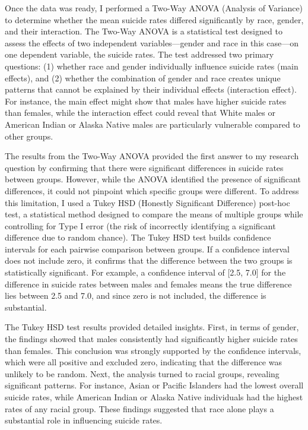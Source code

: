 \documentclass[
  letterpaper,
  DIV=11,
  numbers=noendperiod]{scrartcl}
\begin{document}
Once the data was ready, I performed a Two-Way ANOVA (Analysis of
Variance) to determine whether the mean suicide rates differed
significantly by race, gender, and their interaction. The Two-Way ANOVA
is a statistical test designed to assess the effects of two independent
variables---gender and race in this case---on one dependent variable,
the suicide rates. The test addressed two primary questions: (1) whether
race and gender individually influence suicide rates (main effects), and
(2) whether the combination of gender and race creates unique patterns
that cannot be explained by their individual effects (interaction
effect). For instance, the main effect might show that males have higher
suicide rates than females, while the interaction effect could reveal
that White males or American Indian or Alaska Native males are
particularly vulnerable compared to other groups.

The results from the Two-Way ANOVA provided the first answer to my
research question by confirming that there were significant differences
in suicide rates between groups. However, while the ANOVA identified the
presence of significant differences, it could not pinpoint which
specific groups were different. To address this limitation, I used a
Tukey HSD (Honestly Significant Difference) post-hoc test, a statistical
method designed to compare the means of multiple groups while
controlling for Type I error (the risk of incorrectly identifying a
significant difference due to random chance). The Tukey HSD test builds
confidence intervals for each pairwise comparison between groups. If a
confidence interval does not include zero, it confirms that the
difference between the two groups is statistically significant. For
example, a confidence interval of {[}2.5, 7.0{]} for the difference in
suicide rates between males and females means the true difference lies
between 2.5 and 7.0, and since zero is not included, the difference is
substantial.

The Tukey HSD test results provided detailed insights. First, in terms
of gender, the findings showed that males consistently had significantly
higher suicide rates than females. This conclusion was strongly
supported by the confidence intervals, which were all positive and
excluded zero, indicating that the difference was unlikely to be random.
Next, the analysis turned to racial groups, revealing significant
patterns. For instance, Asian or Pacific Islanders had the lowest
overall suicide rates, while American Indian or Alaska Native
individuals had the highest rates of any racial group. These findings
suggested that race alone plays a substantial role in influencing
suicide rates.
\end{document}
